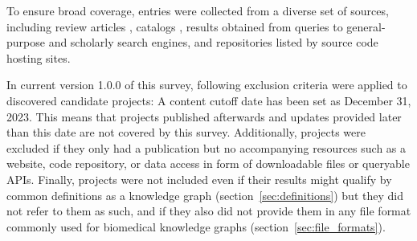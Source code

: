 \documentclass{article}
\begin{document}
To ensure broad coverage, entries were collected from a diverse set of sources, including review articles
\cite{abusalih2021}
\cite{babalou2023}
\cite{bonner2022}
\cite{callahan2020}
\cite{chatterjee2021}
\cite{galluzzo2022}
\cite{hansel2023}
\cite{maclean2021}
\cite{qian2019}
\cite{rajabi2022}
\cite{thessen2020},
catalogs
\cite{astrazeneca2023}
\cite{callahan2023}
\cite{linkedopendata2023},
results obtained from queries to general-purpose and scholarly search engines,
and repositories listed by source code hosting sites.

In current version 1.0.0 of this survey, following exclusion criteria were applied to discovered candidate projects: A content cutoff date has been set as December 31, 2023. This means that projects published afterwards and updates provided later than this date are not covered by this survey. Additionally, projects were excluded if they only had a publication but no accompanying resources such as a website, code repository, or data access in form of downloadable files or queryable APIs. Finally, projects were not included even if their results might qualify by common definitions as a knowledge graph (section~\ref{sec:definitions}) but they did not refer to them as such, and if they also did not provide them in any file format commonly used for biomedical knowledge graphs (section~\ref{sec:file_formats}).
\end{document}
